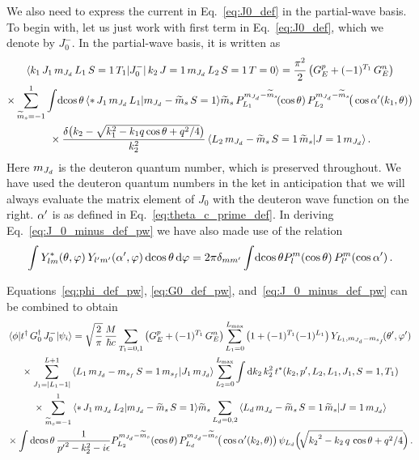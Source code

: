 	We also need to express the current in Eq.~\eqref{eq:J0_def} in the
	partial-wave basis.  To begin with, let us just work with first term in
	Eq.~\eqref{eq:J0_def}, which we denote by $J_0 ^-$.  In the partial-wave
	basis, it is written as
	\begin{multline}
	 \mbraket{k_1 \, J_1 \, \mJd \, L_1 \, S = 1 \, T_1}{J_0^{-}}
	 {\,k_2 \, J=1 \, \mJd \, L_2 \, S = 1 \, T = 0}
	 = \frac{\pi^2}{2} \, \big(G_E ^p + (-1)^{T_1} \, G_E^n\big) \\
	 \times \sum_{\widetilde{m}_s = -1}^1 \int\!\dcostheta
	 \,\CG*{J_1}{\mJd}{L_1}{\mJd - \widetilde{m}_s}{S = 1}{\widetilde{m}_s}
	 \,P_{L_1}^{\mJd - \widetilde{m}_s}\!(\cos\theta)
	 \,P_{L_2}^{\mJd - \widetilde{m}_s}\!\big(\cos\thetacprime(k_1, \theta)\big) \\
	 \null\times \frac{\delta\big(k_2-\sqrt{k_1^2-k_1 q \cos\theta + q^2/4}\big)}
	 {k_2^2}
	 \,\CG{L_2}{\mJd - \widetilde{m}_s}{S = 1}{\widetilde{m}_s}{J = 1}{\mJd} \,.
	\label{eq:J_0_minus_def_pw}
	\end{multline}
	Here $m_{J_d}$ is the deuteron quantum number, which is preserved throughout.
	We have used the deuteron quantum numbers in the ket in anticipation
	that we will always evaluate the matrix element of $J_0$ with the deuteron
	wave function on the right.   $\alpha^\prime$ is as defined in
	Eq.~\eqref{eq:theta_c_prime_def}.  In deriving Eq.~\eqref{eq:J_0_minus_def_pw}
	we have also made use of the relation \cite{Jerry_thesis}
	\begin{equation}
	 \int Y_{lm} ^\ast(\theta, \varphi) \,
	 Y_{l^\prime m^\prime}(\alpha^\prime,\varphi)
	 \,\mathrm{d}\!\cos \theta \, \mathrm{d} \varphi
	 = 2\pi \delta_{m m^\prime}
	 \int\!\mathrm{d} \! \cos \theta
	 P_l^m(\cos\theta) \, P_{l^\prime}^m(\cos \alpha^\prime) \,.
	\end{equation}

	Equations~\eqref{eq:phi_def_pw}, \eqref{eq:G0_def_pw},
	and~\eqref{eq:J_0_minus_def_pw} can be combined to obtain
	\begin{multline}
	 \mbraket{\phi}{t^\dag \, \GreensFn^\dag \, J_0^-}{\psi_i}
	 = \sqrt{\frac{2}{\pi}} \,\frac{M}{\hbar c}
	 \sum_{T_1 = 0,1} \big(G_E ^p + (-1)^{T_1} \, G_E^n\big)
	 \sum_{L_1 = 0}^{L_{\rm max}} \big(1 + (-1)^{T_1} (-1)^{L_1}\big)
	 \, Y_{L_1 , \mJd - \msf}\!(\thetacm, \phicm) \\
	 \null\times \sum_{J_1 = |L_1 - 1|}^{L+1}
	 \CG{L_1}{\mJd - \msf}{S=1}{\msf}{J_1}{\mJd}
	 \sum_{L_2 = 0}^{L_{\rm max}} \int \dd k_2 \, k_2^2 \,
	  t^\ast(k_2, \pp, L_2, L_1, J_1, S = 1, T_1) \\
	 \null\times \sum_{\widetilde{m}_s = -1}^1
	 \CG*{J_1}{\mJd}{L_2}{\mJd - \widetilde{m}_s}{S = 1}{\widetilde{m}_s}
	 \sum_{L_d = 0,2}
	 \CG{L_d}{\mJd - \widetilde{m}_s}{S = 1}{\widetilde{m}_s}{J = 1}{\mJd} \\
	 \null\times \int \dcostheta
	 \, \frac{1}{{\pp}^2 - k_2^2 - i \epsilon}
	 P_{L_2}^{\mJd - \widetilde{m}_s}(\cos\theta) \,
	 P_{L_d}^{\mJd - \widetilde{m}_s}\!\big(\cos\thetacprime(k_2,\theta)\big) \,
	 \psi_{L_d}\Big(\!\sqrt{{k_2}^2 - k_2 \, q \, \cos\theta + q^2/4}\Big) \,.
	\label{eq:phi_t_g0_J0_minus}
	\end{multline}



